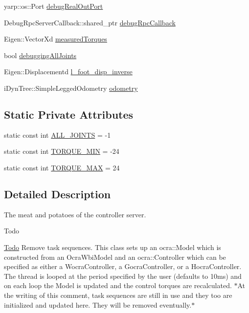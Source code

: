 \begin{DoxyCompactItemize}
yarp\-::os\-::\-Port \hyperlink{classThread_a9bd7f6aebc0be4709f32f95aa32f1add}{debug\-Real\-Out\-Port}
\item 
\-Debug\-Rpc\-Server\-Callback\-::shared\-\_\-ptr \hyperlink{classThread_a42833af67d5280e6946a31a03737e017}{debug\-Rpc\-Callback}
\item 
\-Eigen\-::\-Vector\-Xd \hyperlink{classThread_aa9cbe8744e51571a17fa726d8d16a0c6}{measured\-Torques}
\item 
bool \hyperlink{classThread_aba345996b91a57d9e1f2dd15c7c75e08}{debugging\-All\-Joints}
\item 
\-Eigen\-::\-Displacementd \hyperlink{classThread_a304e7ee40ec0ceec2fc7ca80353ab478}{l\-\_\-foot\-\_\-disp\-\_\-inverse}
\item 
i\-Dyn\-Tree\-::\-Simple\-Legged\-Odometry \hyperlink{classThread_a23a41c6ccd1df898084112cfd46120f3}{odometry}
\end{DoxyCompactItemize}
\subsection*{\-Static \-Private \-Attributes}
\begin{DoxyCompactItemize}
\item 
static const int \hyperlink{classThread_a875b3311a39e3b87dbc981f2db7b1b9d}{\-A\-L\-L\-\_\-\-J\-O\-I\-N\-T\-S} = -\/1
\item 
static const int \hyperlink{classThread_ad44e5fbda8070c252ea71823a4b9a6db}{\-T\-O\-R\-Q\-U\-E\-\_\-\-M\-I\-N} = -\/24
\item 
static const int \hyperlink{classThread_a5e864394c4bd0fbdf3cba7f6f825e17d}{\-T\-O\-R\-Q\-U\-E\-\_\-\-M\-A\-X} = 24
\end{DoxyCompactItemize}


\subsection{\-Detailed \-Description}
\-The meat and potatoes of the controller server. 

\begin{DoxyRefDesc}{\-Todo}
\item[\hyperlink{todo__todo000001}{\-Todo}]\-Remove task sequences. \-This class sets up an ocra\-::\-Model which is constructed from an \-Ocra\-Wbi\-Model and an ocra\-::\-Controller which can be specified as either a \-Wocra\-Controller, a \-Gocra\-Controller, or a \-Hocra\-Controller. \-The thread is looped at the period specified by the user (defaults to 10ms) and on each loop the \-Model is updated and the control torques are recalculated. $\ast$\-At the writing of this comment, task sequences are still in use and they too are initialized and updated here. \-They will be removed eventually.$\ast$ \end{DoxyRefDesc}


